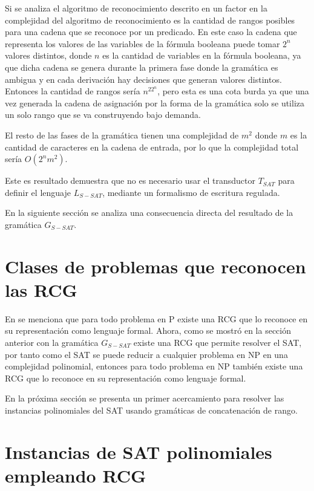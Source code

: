 \documentclass[12pt]{article}
\begin{document}
Si se analiza el algoritmo de reconocimiento descrito en \cite{mainRCGBib}
un factor en la complejidad del algoritmo de reconocimiento es la cantidad de rangos posibles para una cadena
que se reconoce por un predicado. En este caso la cadena que representa los valores de las variables de la
fórmula booleana puede tomar $2^n$ valores distintos, donde $n$ es la cantidad de variables en la fórmula booleana,
ya que dicha cadena se genera durante la primera fase donde la gramática es ambigua y en cada derivación hay
decisiones que generan valores distintos.
Entonces la cantidad de rangos sería $n^22^n$, pero esta es una cota burda ya que una vez generada
la cadena de asignación por la forma de la gramática solo se utiliza un solo rango que se va construyendo
bajo demanda.

El resto de las fases de la gramática tienen una complejidad de $m^2$ donde $m$ es la cantidad de caracteres
en la cadena de entrada, por lo que la complejidad total sería $O(2^nm^2)$.

Este es resultado demuestra que no es necesario usar el transductor $T_{SAT}$ para definir el lenguaje $L_{S-SAT}$,  mediante un formalismo de escritura regulada. 

En la siguiente sección se analiza una consecuencia directa del resultado de la gramática $G_{S-SAT}$.

\section{Clases de problemas que reconocen las RCG}

En \cite{propertiesRCGBib2} se menciona que para todo problema en P existe una RCG que lo reconoce en su representación como
lenguaje formal. Ahora, como se mostró en la sección anterior con la gramática $G_{S-SAT}$ existe una RCG que permite resolver el SAT, por tanto como el SAT se puede reducir a cualquier problema en NP en una complejidad polinomial, entonces para todo problema en NP también existe una RCG que lo reconoce en su representación como lenguaje formal.

En la próxima sección se presenta un primer acercamiento para resolver las instancias polinomiales del SAT usando gramáticas
de concatenación de rango.

\section{Instancias de SAT polinomiales empleando RCG}
\end{document}
